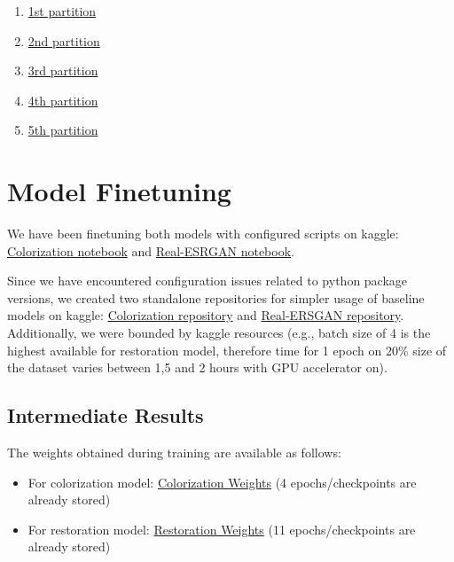 \documentclass{article}
\begin{document}
\begin{enumerate}
    \item \href{https://www.kaggle.com/datasets/railsabirov/trainlid-split-1fifth}{1st partition}
    \item \href{https://www.kaggle.com/datasets/railsabirov/TrainLID-Split-1fifthV2/data}{2nd partition}
    \item \href{https://www.kaggle.com/datasets/railsabirov/TrainLID-Split-1fifthV3/data}{3rd partition}
    \item \href{https://www.kaggle.com/datasets/railsabirov/TrainLID-Split-1fifthV4/data}{4th partition}
    \item \href{https://www.kaggle.com/datasets/railsabirov/TrainLID-Split-1fifthV5/data}{5th partition}
\end{enumerate}

\section{Model Finetuning}
\par We have been finetuning both models with configured scripts on kaggle: \href{https://www.kaggle.com/code/railsabirov/colorizationmodelfinetune}{Colorization notebook} and \href{https://www.kaggle.com/code/railsabirov/real-esrgan-training}{Real-ESRGAN notebook}.
\par  Since we have encountered configuration issues related to python package versions, we created two standalone repositories for simpler usage of baseline models on kaggle: \href{https://github.com/RailSAB/coloringModel}{Colorization repository} and \href{https://github.com/RailSAB/real-esrganmodel}{Real-ERSGAN repository}. Additionally, we were bounded by kaggle resources (e.g., batch size of 4 is the highest available for restoration model, therefore time for 1 epoch on 20\% size of the dataset varies between 1,5 and 2 hours with GPU accelerator on).
\subsection{Intermediate Results}
\par The weights obtained during training are available as follows:

\begin{itemize}
    \item For colorization model: \href{https://www.kaggle.com/models/railsabirov/coloring}{Colorization Weights} (4 epochs/checkpoints are already stored)
    \item For restoration model: \href{https://www.kaggle.com/datasets/ivanilichev/checkpoints-for-readl-ersgan}{Restoration Weights} (11 epochs/checkpoints are already stored)
\end{itemize}
\end{document}
